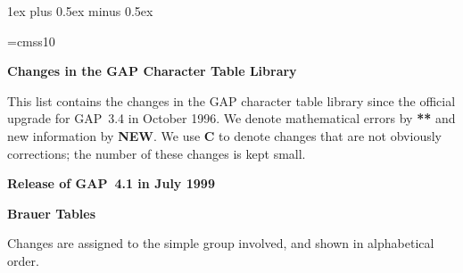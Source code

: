 
\parskip 1ex plus 0.5ex minus 0.5ex
\parindent0pt

\font\sf=cmss10
\def\CAS{{\sf CAS}}
\def\GAP{{\sf GAP}}
\def\MOC{{\sf MOC}}
\def\ATLAS{{\sf ATLAS}}

\def\contrib#1{(contributed #1)}

\def\tthdump#1{#1}

\tthdump{\centerline{\bf Changes in the {\GAP} Character Table Library}}

\bigbreak


This list contains the changes in the {\GAP} character table library
since the official upgrade for {\GAP}~3.4 in October 1996.
We denote mathematical errors by {\bf ***} and new information
by {\bf NEW}\null.
We use {\bf C} to denote changes that are not obviously corrections;
the number of these changes is kept small.

\bigbreak

{\bf Release of {\GAP}~4.1 in July 1999}

\bigbreak

{\bf Brauer Tables}

Changes are assigned to the simple group involved,
and shown in alphabetical order.

\medbreak

